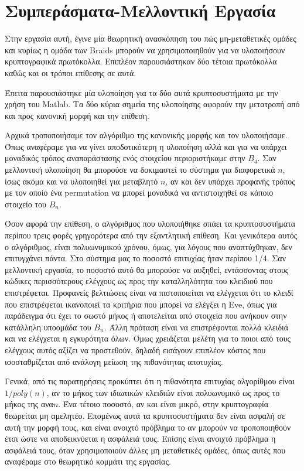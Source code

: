 \section{Συμπεράσματα-Μελλοντική Εργασία}

Στην εργασία αυτή, έγινε μία θεωρητική ανασκόπηση του πώς μη-μεταθετικές ομάδες και κυρίως η ομάδα των Braids μπορούν να χρησιμοποιηθούν για να υλοποιήσουν κρυπτογραφικά πρωτόκολλα. Επιπλέον παρουσιάστηκαν  δύο τέτοια πρωτόκολλα καθώς και οι τρόποι επίθεσης σε αυτά.

Έπειτα παρουσιάστηκε μία υλοποίηση για τα δύο αυτά κρυπτοσυστήματα με την χρήση του Matlab. 
Τα δύο κύρια σημεία της υλοποίησης αφορούν την μετατροπή από και προς κανονική μορφή και την επίθεση.

Αρχικά τροποποιήσαμε τον αλγόριθμο της κανονικής μορφής και τον υλοποιήσαμε. Όπως αναφέραμε για να γίνει αποδοτικότερη η υλοποίηση αλλά και για να υπάρχει μοναδικός τρόπος αναπαράστασης ενός στοιχείου περιοριστήκαμε στην $ B_4 $. Σαν μελλοντική υλοποίηση θα μπορούσε να δοκιμαστεί το σύστημα για διαφορετικά $ n $, ίσως ακόμα και να υλοποιηθεί για μεταβλητό $ n $, αν και δεν υπάρχει προφανής τρόπος με τον οποίο ένα permutation να μπορεί μοναδικά να αντιστοιχηθεί σε κάποιο στοιχείο του $ B_n $.

Όσον αφορά την επίθεση, ο αλγόριθμος που υλοποιήθηκε σπάει τα κρυπτοσυστήματα περίπου τρεις φορές γρηγορότερα από την εξαντλητική επίθεση. Και γενικότερα αυτός ο αλγόριθμος, είναι πολυωνυμικού χρόνου, όμως, για λόγους που αναπτύχθηκαν,  δεν επιτυγχάνει πάντα. Στο σύστημα μας το ποσοστό επιτυχίας ήταν περίπου 1/4. Σαν μελλοντική εργασία, το ποσοστό αυτό θα μπορούσε να αυξηθεί, εντάσσοντας στους κώδικες περισσότερους ελέγχους ως προς την καταλληλότητα του κλειδιού που επιστρέφεται. 
Προφανείς βελτιώσεις είναι να πιστοποιείται να ελέγχεται ότι το κλειδί που επιστρέφεται ικανοποιεί τα κριτήρια που μπορεί να ελέγξει η Eve, όπως για παράδειγμα ότι έχει το σωστό μήκος ή αποτελείται από στοιχεία που ανήκουν στην κατάλληλη υποομάδα του $ B_n $. Άλλη πρόταση είναι να επιστρέφονται πολλά κλειδιά και να ελέγχεται η εγκυρότητα όλων. Όμως χρειάζεται μελέτη για το ποιοι από τους ελέγχους αυτός αξίζει να προστεθούν, δηλαδή εισάγουν επιπλέον κόστος που ισοσταθμίζεται από ανάλογη μείωση της πιθανότητας αποτυχίας.

Γενικά, από τις παρατηρήσεις προκύπτει ότι η πιθανότητα επιτυχίας αλγορίθμου είναι $1/poly(n)$, αν το μήκος των ιδιωτικών κλειδιών είναι πολυωνυμικό ως προς το μήκος της ανα$ n $.  Ένα τέτοιο ποσοστό, αν και είναι μικρό, στην κρυπτογραφία θεωρείται μη αμελητέο.
Επομένως αυτά τα κρυπτοσυστήματα δεν είναι ασφαλή σε αυτή την μορφή τους, και είναι ανοιχτό πρόβλημα το αν μπορούν να τροποποιηθούν έτσι ώστε να αποδεικνύεται η ασφάλειά τους. Επίσης είναι ανοιχτό πρόβλημα η ασφάλειά τους, όταν χρησιμοποιούν άλλες μη μεταθετικές ομάδες, όπως αυτές που αναφέραμε στο θεωρητικό κομμάτι της εργασίας.
